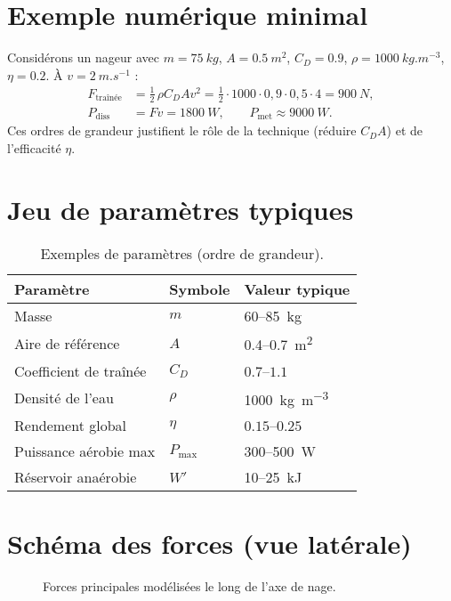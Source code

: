\documentclass[11pt,a4paper]{article}
\begin{document}
\section{Exemple numérique minimal}
Considérons un nageur avec $m=\SI{75}{kg}$, $A=\SI{0.5}{m^2}$, $C_D=0.9$, $\rho=\SI{1000}{kg.m^{-3}}$, $\eta=0.2$. À $v=\SI{2}{m.s^{-1}}$ :
\begin{align}
 F_{\mathrm{traînée}} &= \tfrac{1}{2}\,\rho C_D A v^2 = \tfrac{1}{2}\cdot1000\cdot0{,}9\cdot0{,}5\cdot 4 = \SI{900}{N}, \\
 P_{\mathrm{diss}} &= Fv = \SI{1800}{W}, \qquad P_{\mathrm{met}} \approx \SI{9000}{W}.
 \end{align}
Ces ordres de grandeur justifient le rôle de la technique (réduire $C_D A$) et de l'efficacité $\eta$.

\section{Jeu de paramètres typiques}
\begin{table}[h]
 \centering
 \caption{Exemples de paramètres (ordre de grandeur).}
 \label{tab:param}
 \begin{tabular}{@{}lll@{}}
  \toprule
  Paramètre & Symbole & Valeur typique \\
  \midrule
  Masse & $m$ & \SI{60}{}--\SI{85}{kg} \\
  Aire de référence & $A$ & \SI{0.4}{}--\SI{0.7}{m^2} \\
  Coefficient de traînée & $C_D$ & $0.7$--$1.1$ \\
  Densité de l'eau & $\rho$ & \SI{1000}{kg.m^{-3}} \\
  Rendement global & $\eta$ & $0.15$--$0.25$ \\
  Puissance aérobie max & $P_{\max}$ & \SI{300}{}--\SI{500}{W} \\
  Réservoir anaérobie & $W'$ & \SI{10}{}--\SI{25}{kJ} \\
  \bottomrule
 \end{tabular}
\end{table}

\section{Schéma des forces (vue latérale)}
\begin{figure}[h]
 \centering
 \caption{Forces principales modélisées le long de l'axe de nage.}
\end{figure}
\end{document}
